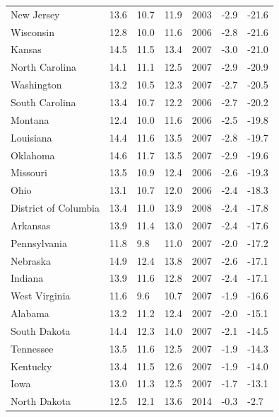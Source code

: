 \begin{longtable}{llllrll}
New Jersey & 13.6 & 10.7 & 11.9 & 2003 & -2.9 & -21.6 \\
Wisconsin & 12.8 & 10.0 & 11.6 & 2006 & -2.8 & -21.6 \\
Kansas & 14.5 & 11.5 & 13.4 & 2007 & -3.0 & -21.0 \\
North Carolina & 14.1 & 11.1 & 12.5 & 2007 & -2.9 & -20.9 \\
Washington & 13.2 & 10.5 & 12.3 & 2007 & -2.7 & -20.5 \\
South Carolina & 13.4 & 10.7 & 12.2 & 2006 & -2.7 & -20.2 \\
Montana & 12.4 & 10.0 & 11.6 & 2006 & -2.5 & -19.8 \\
Louisiana & 14.4 & 11.6 & 13.5 & 2007 & -2.8 & -19.7 \\
Oklahoma & 14.6 & 11.7 & 13.5 & 2007 & -2.9 & -19.6 \\
Missouri & 13.5 & 10.9 & 12.4 & 2006 & -2.6 & -19.3 \\
Ohio & 13.1 & 10.7 & 12.0 & 2006 & -2.4 & -18.3 \\
District of Columbia & 13.4 & 11.0 & 13.9 & 2008 & -2.4 & -17.8 \\
Arkansas & 13.9 & 11.4 & 13.0 & 2007 & -2.4 & -17.6 \\
Pennsylvania & 11.8 & 9.8 & 11.0 & 2007 & -2.0 & -17.2 \\
Nebraska & 14.9 & 12.4 & 13.8 & 2007 & -2.6 & -17.1 \\
Indiana & 13.9 & 11.6 & 12.8 & 2007 & -2.4 & -17.1 \\
West Virginia & 11.6 & 9.6 & 10.7 & 2007 & -1.9 & -16.6 \\
Alabama & 13.2 & 11.2 & 12.4 & 2007 & -2.0 & -15.1 \\
South Dakota & 14.4 & 12.3 & 14.0 & 2007 & -2.1 & -14.5 \\
Tennessee & 13.5 & 11.6 & 12.5 & 2007 & -1.9 & -14.3 \\
Kentucky & 13.4 & 11.5 & 12.6 & 2007 & -1.9 & -14.0 \\
Iowa & 13.0 & 11.3 & 12.5 & 2007 & -1.7 & -13.1 \\
North Dakota & 12.5 & 12.1 & 13.6 & 2014 & -0.3 & -2.7 \\

\end{longtable}
